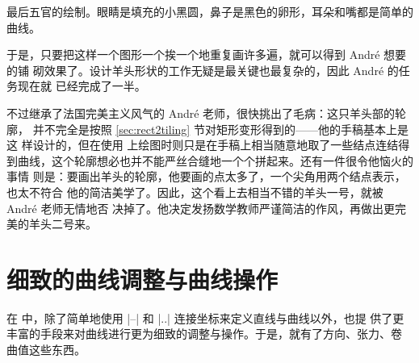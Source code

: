 最后五官的绘制。眼睛是填充的小黑圆，鼻子是黑色的卵形，耳朵和嘴都是简单的曲线。

于是，只要把这样一个图形一个挨一个地重复画许多遍，就可以得到 André 想要的铺
砌效果了。设计羊头形状的工作无疑是最关键也最复杂的，因此 André 的任务现在就
已经完成了一半。

不过继承了法国完美主义风气的 André 老师，很快挑出了毛病：这只羊头部的轮廓，
并不完全是按照 \ref{sec:rect2tiling} 节对矩形变形得到的——他的手稿基本上是这
样设计的，但在使用 \Asy{} 上绘图时则只是在手稿上相当随意地取了一些结点连结得
到曲线，这个轮廓想必也并不能严丝合缝地一个个拼起来。还有一件很令他恼火的事情
则是：要画出羊头的轮廓，他要画的点太多了，一个尖角用两个结点表示，也太不符合
他的简洁美学了。因此，这个看上去相当不错的羊头一号，就被 André 老师无情地否
决掉了。他决定发扬数学教师严谨简洁的作风，再做出更完美的羊头二号来。

\section{细致的曲线调整与曲线操作}
\label{sec:curve}

在 \Asy{} 中，除了简单地使用 |--| 和 |..| 连接坐标来定义直线与曲线以外，也提
供了更丰富的手段来对曲线进行更为细致的调整与操作。于是，就有了方向、张力、卷
曲值这些东西。

